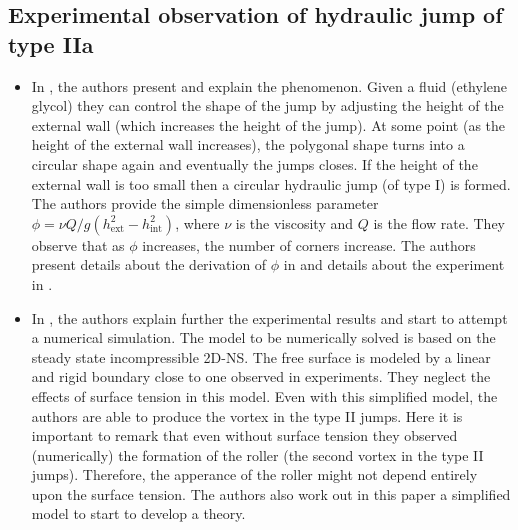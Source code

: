 \documentclass[english,11pt]{article}
\let\cite=\citet
\numberwithin{remark}{subsection}
\begin{document}
\subsection{Experimental observation of hydraulic jump of type IIa}
\begin{itemize}
\item In \cite{ellegaard1998creating}, the authors present and explain the phenomenon.
  Given a fluid (ethylene glycol) they can control the shape of the jump by adjusting the height of the external wall
  (which increases the height of the jump).
  At some point (as the height of the external wall increases), the polygonal shape turns into a circular shape again and eventually the jumps closes.
  If the height of the external wall is too small then a circular hydraulic jump (of type I) is formed.
  The authors provide the simple dimensionless parameter $\phi=\nu Q/g(h_\text{ext}^2-h_\text{int}^2)$, where $\nu$ is the viscosity
  and $Q$ is the flow rate. They observe that as $\phi$ increases, the number of corners increase.
  The authors present details about the derivation of $\phi$ in \cite{ellegaard1999cover} and details about the experiment in
  \cite{ellegaard1996experimental}.

\item In \cite{bohr1996hydraulic}, the authors explain further the experimental results and start to attempt a numerical simulation.
  The model to be numerically solved is based on the steady state incompressible 2D-NS.
  The free surface is modeled by a linear and rigid boundary close to one observed in experiments.
  They neglect the effects of surface tension in this model. Even with this simplified model, the authors are able
  to produce the vortex in the type II jumps.
  Here it is important to remark that even without surface tension they observed (numerically) the formation of the
  roller (the second vortex in the type II jumps). Therefore, the apperance of the roller might not depend entirely upon the
  surface tension. 
  The authors also work out in this paper a simplified model to start to develop a theory.


\end{itemize}
\end{document}
